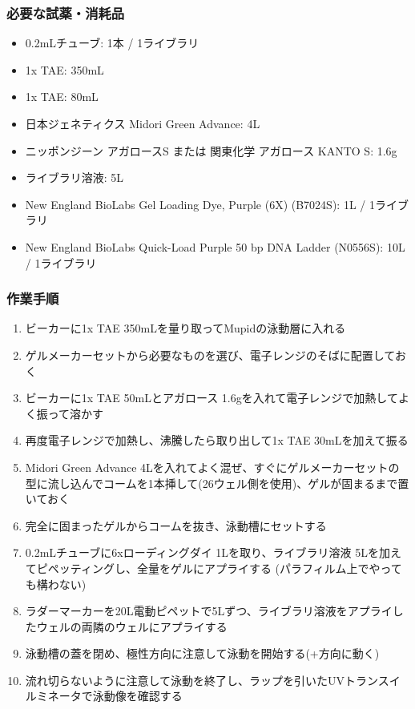 \documentclass[titlepage,10pt,a4paper,uplatex]{jsbook}
\begin{document}
\subsubsection{必要な試薬・消耗品}
\begin{itemize}
\item 0.2mLチューブ: 1本 / 1ライブラリ
\item 1x TAE: 350mL
\item 1x TAE: 80mL
\item 日本ジェネティクス Midori Green Advance: 4{\textmu}L
\item ニッポンジーン アガロースS または 関東化学 アガロース KANTO S: 1.6g
\item ライブラリ溶液: 5{\textmu}L
\item New England BioLabs Gel Loading Dye, Purple (6X) (B7024S): 1{\textmu}L / 1ライブラリ
\item New England BioLabs Quick-Load Purple 50 bp DNA Ladder (N0556S): 10{\textmu}L / 1ライブラリ
\end{itemize}

\subsubsection{作業手順}
\begin{enumerate}
\item ビーカーに1x TAE 350mLを量り取ってMupidの泳動層に入れる
\item ゲルメーカーセットから必要なものを選び、電子レンジのそばに配置しておく
\item ビーカーに1x TAE 50mLとアガロース 1.6gを入れて電子レンジで加熱してよく振って溶かす
\item 再度電子レンジで加熱し、沸騰したら取り出して1x TAE 30mLを加えて振る
\item Midori Green Advance 4{\textmu}Lを入れてよく混ぜ、すぐにゲルメーカーセットの型に流し込んでコームを1本挿して(26ウェル側を使用)、ゲルが固まるまで置いておく
\item 完全に固まったゲルからコームを抜き、泳動槽にセットする
\item 0.2mLチューブに6xローディングダイ 1{\textmu}Lを取り、ライブラリ溶液 5{\textmu}Lを加えてピペッティングし、全量をゲルにアプライする (パラフィルム上でやっても構わない)
\item ラダーマーカーを20{\textmu}L電動ピペットで5{\textmu}Lずつ、ライブラリ溶液をアプライしたウェルの両隣のウェルにアプライする
\item 泳動槽の蓋を閉め、極性方向に注意して泳動を開始する(+方向に動く)
\item 流れ切らないように注意して泳動を終了し、ラップを引いたUVトランスイルミネータで泳動像を確認する
\end{enumerate}
\end{document}
